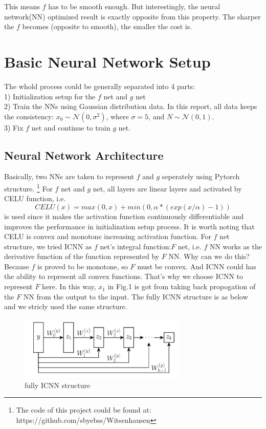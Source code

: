 \documentclass[conference,compsoc]{IEEEtran}
\begin{document}
This means $f$ has to be smooth enough. But interestingly, the neural network(NN) optimized result is exactly opposite from this property. The sharper the $f$ becomes (opposite to smooth), the smaller the cost is.

\section{Basic Neural Network Setup}
The whold process could be generally separated into 4 parts:\\
1) Initialization setup for the $f$ net and $g$ net\\
2) Train the NNs using Gaussian distribution data. In this report, all data keeps the consistency: $x_0\sim \mathcal{N} (0,\sigma^2)$, where $\sigma=5$, and $N\sim \mathcal{N} (0,1)$. \\
3) Fix $f$ net and continue to train $g$ net.

\subsection{Neural Network Architecture}
 Basically, two NNs are taken to represent $f$ and $g$ seperately using Pytorch structure. \footnote{The code of this project could be found at: https://github.com/sbyebss/Witsenhausen}
For $f$ net and $g$ net, all layers are linear layers and activated by CELU\cite{barron2017continuously} function, i.e. 
\begin{equation}
  CELU(x)=max(0,x)+min(0,\alpha*(exp(x/\alpha)-1))
\end{equation}
is used since it makes the activation function continuously differentiable and improves the performance in initialization setup process. It is worth noting that CELU is convex and monotone increasing activation function.
For $f$ net structure, we tried ICNN as $f$ net's integral function:$F$ net, i.e. $f$ NN works as the derivative function of the function represented by $F$ NN. Why can we do this? Because $f$ is proved to be monotone, so $F$ must be convex. And ICNN could has the ability to represent all convex functions. That's why we choose ICNN to represent $F$ here. In this way, $x_1$ in Fig.1 is got from taking back propogation of the $F$ NN from the output to the input. The fully ICNN structure is as below and we stricly used the same structure.
\begin{figure}[htp]
  \centering
  \includegraphics[width=8cm]{images/ICNN.png}
  \caption{fully ICNN structure}
  \label{fig:definition}
\end{figure}
\end{document}
